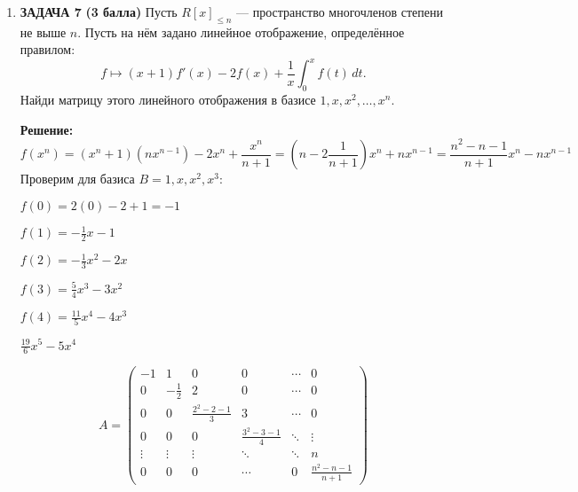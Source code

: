 \documentclass[a4paper,12pt]{article}
\begin{document}
\begin{enumerate}
    \item \textbf{ЗАДАЧА 7} \textbf{(3 балла)} Пусть $R[x]_{\leq n}$ — пространство многочленов степени не выше $n$. Пусть на нём задано линейное отображение, определённое правилом:
    \[
    f \mapsto (x + 1)f'(x) - 2f(x) + \frac{1}{x} \int_{0}^{x} f(t) \, dt.
    \]
    Найди матрицу этого линейного отображения в базисе $1, x, x^2, \dots, x^n$.

    \textbf{Решение: }
    \[
    f(x^n) = (x^n+1)(nx^{n-1})-2x^n+\frac{x^n}{n+1}=(n-2\frac{1}{n+1})x^n + nx^{n-1}=\frac{n^2-n-1}{n+1}x^n - nx^{n-1} 
    \]
    Проверим для базиса  $B = {1, x, x^2, x^3}$:
    
    $f(0) = 2(0)-2+1=-1$

    $f(1)= -\frac{1}{2}x-1$
    
    $f(2)=-\frac{1}{3}x^2 - 2x$

    $f(3)=\frac{5}{4}x^3-3x^2$

    $f(4)=\frac{11}{5}x^4-4x^3$

    $\frac{19}{6}x^5-5x^4$

    \[
    A = \begin{pmatrix}
    -1 & 1 & 0 & 0 & \cdots & 0 \\
    0 & -\frac{1}{2} & 2 & 0 & \cdots & 0 \\
    0 & 0 & \frac{2^2 - 2 - 1}{3} & 3 & \cdots & 0 \\
    0 & 0 & 0 & \frac{3^2 - 3 - 1}{4} & \ddots & \vdots \\
    \vdots & \vdots & \vdots & \ddots & \ddots & n \\
    0 & 0 & 0 & \cdots & 0 & \frac{n^2 - n - 1}{n+1}
    \end{pmatrix}
    \]


\end{enumerate}
\end{document}
